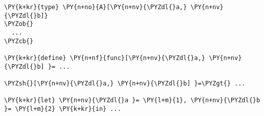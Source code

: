 \begin{Verbatim}[commandchars=\\\{\}]
\PY{k+kr}{type} \PY{n+no}{A}[\PY{n+nv}{\PYZdl{}a,} \PY{n+nv}{\PYZdl{}b]}
\PYZob{}
  ...
\PYZcb{}

\PY{k+kr}{define} \PY{n+nf}{func}[\PY{n+nv}{\PYZdl{}a,} \PY{n+nv}{\PYZdl{}b] }= ...

\PYZsh{}[\PY{n+nv}{\PYZdl{}a,} \PY{n+nv}{\PYZdl{}b] }=\PYZgt{} ...

\PY{k+kr}{let} \PY{n+nv}{\PYZdl{}a }= \PY{l+m}{1}, \PY{n+nv}{\PYZdl{}b }= \PY{l+m}{2} \PY{k+kr}{in} ...
\end{Verbatim}
